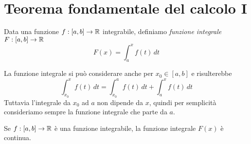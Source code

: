 \section{Teorema fondamentale del calcolo I}

\begin{definition}
Data una funzione $f:[a,b] \to \mathbb R$ integrabile, definiamo \emph{funzione integrale} $F:[a,b] \to \mathbb R$
\begin{equation*}
F(x) = \int_a^x f(t) \, dt
\end{equation*}
\end{definition}

\begin{remark}
La funzione integrale si può considerare anche per $x_0 \in [a,b]$ e risulterebbe
\begin{equation*}
\int_{x_0}^x f(t) \, dt = \int_{x_0}^a f(t) \, dt + \int_a^x f(t) \, dt
\end{equation*}
Tuttavia l'integrale da $x_0$ ad $a$ non dipende da $x$, quindi per semplicità consideriamo sempre la funzione integrale che parte da $a$.
\end{remark}

\begin{theorem}
Se $f:[a,b] \to \mathbb R$ è una funzione integrabile, la funzione integrale $F(x)$ è continua.
\end{theorem}

